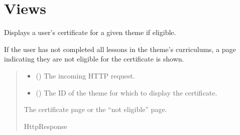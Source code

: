 \documentclass[letterpaper,10pt,english]{sphinxmanual}
\begin{document}
\section{Views}
\label{\detokenize{certificates:module-certificates.views}}\label{\detokenize{certificates:views}}

\begin{fulllineitems}
\label{\detokenize{certificates:certificates.views.view_certificate}}
\pysigstartsignatures
\pysiglinewithargsret
{}
{\sphinxparamcomma {}}
{}
\pysigstopsignatures
\sphinxAtStartPar
Displays a user’s certificate for a given theme if eligible.

\sphinxAtStartPar
If the user has not completed all lessons in the theme’s curriculums,
a page indicating they are not eligible for the certificate is shown.
\begin{quote}\begin{description}
\begin{itemize}
\item {} 
\sphinxAtStartPar
{} () \textendash{} The incoming HTTP request.

\item {} 
\sphinxAtStartPar
{} () \textendash{} The ID of the theme for which to display the certificate.

\end{itemize}

\sphinxAtStartPar
The certificate page or the “not eligible” page.

\sphinxAtStartPar
HttpResponse

\end{description}\end{quote}

\end{fulllineitems}
\end{document}
